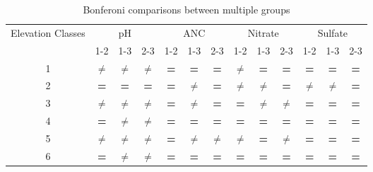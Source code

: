 \begin{table}[htbp]
\caption{Bonferoni comparisons between multiple groups}
\begin{center}
\begin{tabular}{p{2cm}cccccccccccc}
\hline
 Elevation Classes& \multicolumn{ 3}{c}{pH} & \multicolumn{ 3}{c}{ANC} & \multicolumn{ 3}{c}{Nitrate} & \multicolumn{ 3}{c}{Sulfate} \\ \cline{2-13}\noalign{\smallskip}
 & \multicolumn{ 1}{c}{1-2} & 1-3 & 2-3 & 1-2 & 1-3 & 2-3 & 1-2 & 1-3 & 2-3 & 1-2 & 1-3 & 2-3 \\  \cline{2-13}
\multicolumn{1}{c}{1} & \textbf{$\neq$} & \textbf{$\neq$} & \textbf{$\neq$} & \textbf{=} & \textbf{=} & \textbf{=} & \textbf{$\neq$} & \textbf{=} & \textbf{=} & \textbf{=} & \textbf{=} & \textbf{=} \\ 
\multicolumn{1}{c}{2} & \textbf{=} & \textbf{=} & \textbf{=} & \textbf{=} & \textbf{$\neq$} & \textbf{=} & \textbf{$\neq$} & \textbf{$\neq$} & \textbf{=} & \textbf{$\neq$} & \textbf{$\neq$} & \textbf{=} \\ 
\multicolumn{1}{c}{3} & \textbf{$\neq$} & \textbf{$\neq$} & \textbf{$\neq$} & \textbf{=} & \textbf{$\neq$} & \textbf{=} & \textbf{=} & \textbf{$\neq$} & \textbf{$\neq$} & \textbf{=} & \textbf{=} & \textbf{=} \\ 
\multicolumn{1}{c}{4} & \textbf{=} & \textbf{$\neq$} & \textbf{$\neq$} & \textbf{=} & \textbf{=} & \textbf{=} & \textbf{=} & \textbf{=} & \textbf{=} & \textbf{=} & \textbf{=} & \textbf{=} \\ 
\multicolumn{1}{c}{5} & \textbf{$\neq$} & \textbf{$\neq$} & \textbf{$\neq$} & \textbf{=} & \textbf{$\neq$} & \textbf{$\neq$} & \textbf{$\neq$} & \textbf{=} & \textbf{$\neq$} & \textbf{=} & \textbf{=} & \textbf{=} \\ 
\multicolumn{1}{c}{6} & \textbf{=} & \textbf{$\neq$} & \textbf{$\neq$} & \textbf{=} & \textbf{=} & \textbf{=} & \textbf{=} & \textbf{=} & \textbf{=} & \textbf{=} & \textbf{=} & \textbf{=} \\ \hline
\end{tabular}
\end{center}
\label{tab:Bontable}
\end{table}